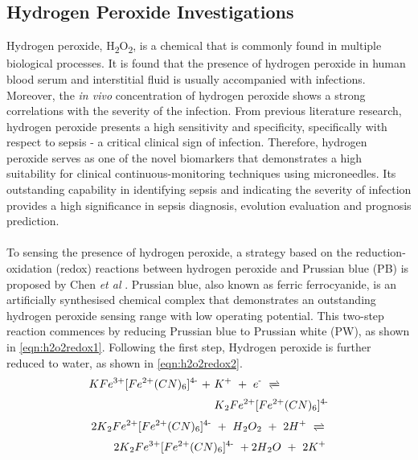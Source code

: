 \subsection{Hydrogen Peroxide Investigations}
Hydrogen peroxide, H\textsubscript{2}O\textsubscript{2}, is a chemical that is commonly found in multiple biological processes. It is found that the presence of hydrogen peroxide in human blood serum and interstitial fluid is usually accompanied with infections. Moreover, the \textit{in vivo} concentration of hydrogen peroxide shows a strong correlations with the severity of the infection. From previous literature research, hydrogen peroxide presents a high sensitivity and specificity, specifically with respect to sepsis - a critical clinical sign of infection. Therefore, hydrogen peroxide serves as one of the novel biomarkers that demonstrates a high suitability for clinical continuous-monitoring techniques using microneedles.  Its outstanding capability in identifying sepsis and indicating the severity of infection provides a high significance in sepsis diagnosis, evolution evaluation and prognosis prediction.\\\\
\noindent To sensing the presence of hydrogen peroxide, a strategy based on the reduction-oxidation (redox) reactions between hydrogen peroxide and Prussian blue (PB) is proposed by Chen \textit{et al} \cite{C9AN02438G}. Prussian blue, also known as ferric ferrocyanide, is an artificially synthesised chemical complex that demonstrates an outstanding hydrogen peroxide sensing range with low operating potential. This two-step reaction commences by reducing Prussian blue to Prussian white (PW), as shown in \autoref{eqn:h2o2redox1}. Following the first step, Hydrogen peroxide is further reduced to water, as shown in \autoref{eqn:h2o2redox2}.
\begin{align} \label{eqn:h2o2redox1}
    KFe^{3+}[Fe\textsuperscript{2+}(CN)\textsubscript{6}]\textsuperscript{4-} \ + \ & K\textsuperscript{+} \ + \   e\textsuperscript{-} \ \xrightleftharpoons{} \\ \nonumber & K\textsubscript{2}Fe\textsuperscript{2+}[Fe\textsuperscript{2+}(CN)\textsubscript{6}]\textsuperscript{4-}
\end{align}
\begin{align} \label{eqn:h2o2redox2}
    & 2K\textsubscript{2}Fe\textsuperscript{2+}[Fe\textsuperscript{2+}(CN)\textsubscript{6}]\textsuperscript{4-} \ + \  H\textsubscript{2}O\textsubscript{2} \ + \ 2H\textsuperscript{+} \ \xrightleftharpoons{} \\ \nonumber & \quad \quad 2K\textsubscript{2}Fe\textsuperscript{3+}[Fe\textsuperscript{2+}(CN)\textsubscript{6}]\textsuperscript{4-} \ + 2H\textsubscript{2}O \ + \ 2K\textsuperscript{+}
\end{align}
